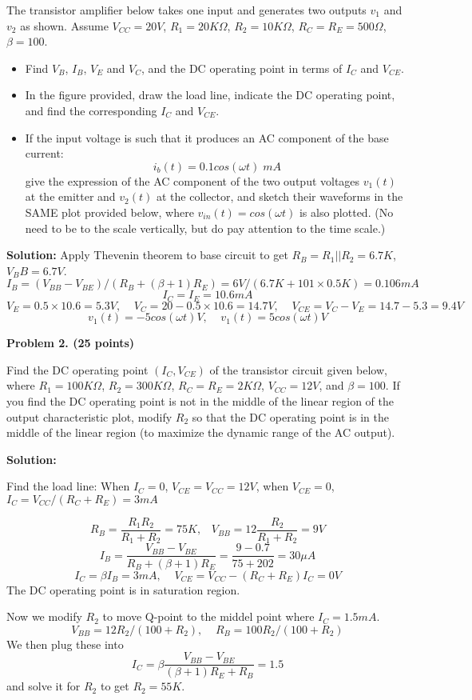 The transistor amplifier below takes one input and generates two
outputs $v_1$ and $v_2$ as shown. Assume $V_{CC}=20V$, $R_1=20K\Omega$, 
$R_2=10K\Omega$, $R_C=R_E=500\Omega$, $\beta=100$. 

\begin{itemize}
\item Find $V_B$, $I_B$, $V_E$ and $V_C$, and the DC operating point in 
terms of $I_C$ and $V_{CE}$. 
\item In the figure provided, draw the load line, indicate the DC operating 
point, and find the corresponding $I_C$ and $V_{CE}$.
\item If the input voltage is such that it produces an AC component of the 
base current:
\[	i_b(t)=0.1 cos(\omega t) \; mA	\]
give the expression of the AC component of the two output voltages $v_1(t)$ 
at the emitter and $v_2(t)$ at the collector, and sketch their waveforms in 
the SAME plot provided below, where $v_{in}(t)=cos(\omega t)$ is also plotted.
(No need to be to the scale vertically, but do pay attention to the time
scale.)
\end{itemize}


{\bf Solution:} 
Apply Thevenin theorem to base circuit to get $R_B=R_1 || R_2=6.7K$, $V_BB=6.7V$.
\[ I_B=(V_{BB}-V_{BE})/(R_B+(\beta+1)R_E)=6V/(6.7K+101\times 0.5K)=0.106 mA \]
\[ I_C=I_E=10.6 mA \]
\[ V_E=0.5\times 10.6=5.3V,\;\;\;\; V_C=20-0.5\times 10.6=14.7V,\;\;\;\;
	V_{CE}=V_C-V_E=14.7-5.3=9.4V \]
\[ v_1(t)=-5 cos(\omega t) V,\;\;\;\;v_1(t)=5 cos(\omega t) V	\]


\item {\bf Problem 2. (25 points)} 

Find the DC operating point $(I_C, V_{CE})$ of the transistor circuit 
given below, where $R_1=100K\Omega$, $R_2=300K\Omega$, $R_C=R_E=2K\Omega$, 
$V_{CC}=12V$, and $\beta=100$. If you find the DC operating point is not 
in the middle of the linear region of the output characteristic plot, 
modify $R_2$ so that the DC operating point is in the middle of the linear
region (to maximize the dynamic range of the AC output).


{\bf Solution:} 

Find the load line: 
When $I_C=0$, $V_{CE}=V_{CC}=12V$, when $V_{CE}=0$, $I_C=V_{CC}/(R_C+R_E)=3mA$
 
\[ R_{B}=\frac{R_1 R_2}{R_1+R_2}=75K,\;\;\;V_{BB}=12\frac{R_2}{R_1+R_2}=9V \]
\[ I_B=\frac{V_{BB}-V_{BE}}{R_B+(\beta+1)R_E}=\frac{9-0.7}{75+202}=30\mu A \]
\[ I_C=\beta I_B=3 mA, \;\;\;\;V_{CE}=V_{CC}-(R_C+R_E)I_C=0V \]
The DC operating point is in saturation region.
 
Now we modify $R_2$ to move Q-point to the middel point where $I_C=1.5mA$.
\[ V_{BB}=12R_2/(100+R_2),\;\;\;\;R_B=100R_2/(100+R_2) \]
We then plug these into 
\[ I_C=\beta \frac{V_{BB}-V_{BE}}{(\beta+1) R_E+R_B}=1.5 \]
and solve it for $R_2$ to get $R_2=55K$.

